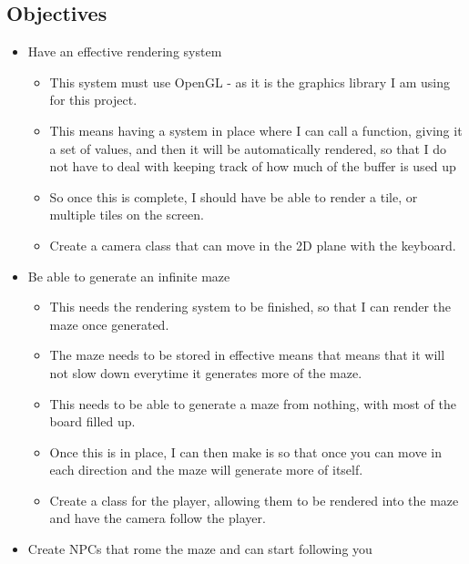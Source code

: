 \documentclass{article}
\begin{document}
        \subsection{Objectives}
            \begin{itemize}
                \item Have an effective rendering system
                    \begin{itemize}
                        \item This system must use OpenGL - as it is the graphics library I am using for this project.
                        \item This means having a system in place where I can call a function, giving it a set of values, and then it will be automatically rendered, so that I do not have to deal with keeping track of how much of the buffer is used up
                        \item So once this is complete, I should have be able to render a tile, or multiple tiles on the screen.
                        \item Create a camera class that can move in the 2D plane with the keyboard.
                    \end{itemize}
                \item Be able to generate an infinite maze
                    \begin{itemize}
                        \item This needs the rendering system to be finished, so that I can render the maze once generated.
                        \item The maze needs to be stored in effective means that means that it will not slow down everytime it generates more of the maze.
                        \item This needs to be able to generate a maze from nothing, with most of the board filled up.
                        \item Once this is in place, I can then make is so that once you can move in each direction and the maze will generate more of itself.
                        \item Create a class for the player, allowing them to be rendered into the maze and have the camera follow the player.
                    \end{itemize}
                \item Create NPCs that rome the maze and can start following you
                    \begin{itemize}

\end{itemize}
\end{itemize}
\end{document}
